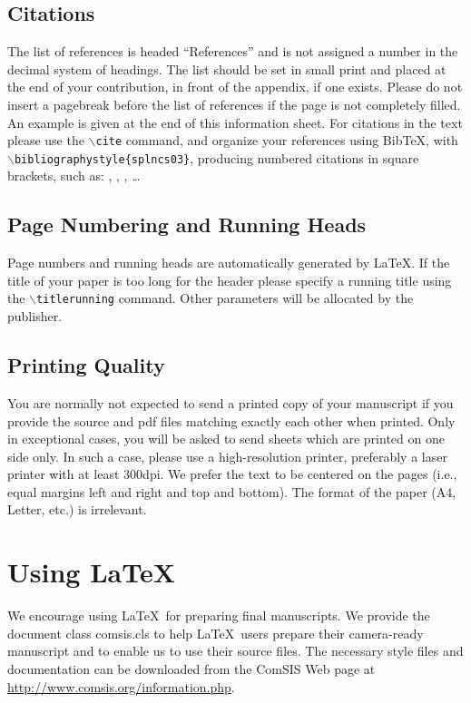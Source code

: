 \documentclass[runningheads]{comsis2}
\begin{document}
\subsection{Citations}

The list of references is headed ``References'' and is not assigned a number
in the decimal system of headings. The list should be set in small print and
placed at the end of your contribution, in front of the appendix, if one
exists. Please do not insert a pagebreak before the list of references if the
page is not completely filled. An example is given at the end of this
information sheet. For citations in the text please use the
\texttt{$\backslash$cite} command, and organize your references using Bib\TeX,
with \texttt{$\backslash$bibliographystyle\{splncs03\}}, producing numbered
citations in square brackets, such as: \cite{Agrawal94VLDB}, \cite{Enc97LNCS},
\cite{DatabaseBook02}, \dots

\subsection{Page Numbering and Running Heads}

Page numbers and running heads are automatically generated by \LaTeX. If the
title of your paper is too long for the header please specify a running title
using the \texttt{$\backslash$titlerunning} command. Other parameters will be
allocated by the publisher.

\subsection{Printing Quality}

You are normally not expected to send a printed copy of your manuscript if you
provide the source and pdf files matching exactly each other when printed.
Only in exceptional cases, you will be asked to send sheets which are printed
on one side only. In such a case, please use a high-resolution printer,
preferably a laser printer with at least 300dpi. We prefer the text to be
centered on the pages (i.e., equal margins left and right and top and bottom).
The format of the paper (A4, Letter, etc.) is irrelevant.


\section{Using \LaTeX}\label{sec:latex}

We encourage using \LaTeX\ for preparing final manuscripts. We provide the
document class comsis.cls to help \LaTeX\ users prepare their camera-ready
manuscript and to enable us to use their source files. The necessary style
files and documentation can be downloaded from the ComSIS Web page at
\url{http://www.comsis.org/information.php}.
\end{document}
